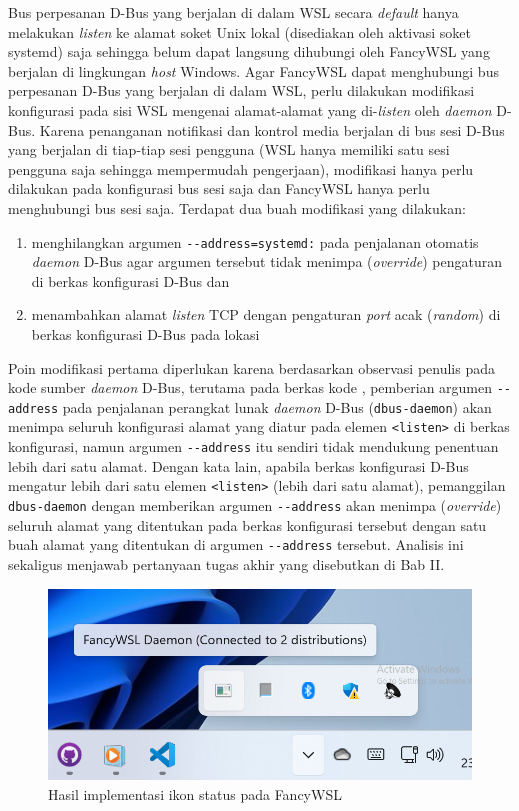 Bus perpesanan D-Bus yang berjalan di dalam WSL secara \textit{default} hanya melakukan \textit{listen} ke alamat soket Unix lokal (disediakan oleh aktivasi soket systemd) saja sehingga belum dapat langsung dihubungi oleh FancyWSL yang berjalan di lingkungan \textit{host} Windows. Agar FancyWSL dapat menghubungi bus perpesanan D-Bus yang berjalan di dalam WSL, perlu dilakukan modifikasi konfigurasi pada sisi WSL mengenai alamat-alamat yang di-\textit{listen} oleh \textit{daemon} D-Bus. Karena penanganan notifikasi dan kontrol media berjalan di bus sesi D-Bus yang berjalan di tiap-tiap sesi pengguna (WSL hanya memiliki satu sesi pengguna saja sehingga mempermudah pengerjaan), modifikasi hanya perlu dilakukan pada konfigurasi bus sesi saja dan FancyWSL hanya perlu menghubungi bus sesi saja. Terdapat dua buah modifikasi yang dilakukan:
\begin{enumerate}
    \item menghilangkan argumen \verb|--address=systemd:| pada penjalanan otomatis \textit{daemon} D-Bus agar argumen tersebut tidak menimpa (\textit{override}) pengaturan di berkas konfigurasi D-Bus dan
    \item menambahkan alamat \textit{listen} TCP dengan pengaturan \textit{port} acak (\textit{random}) di berkas konfigurasi D-Bus pada lokasi 
\end{enumerate}
Poin modifikasi pertama diperlukan karena berdasarkan observasi penulis pada kode sumber \textit{daemon} D-Bus, terutama pada berkas kode  \cite{dbus-source-code-address-argumen-and-listen-config}, pemberian argumen \verb|--address| pada penjalanan perangkat lunak \textit{daemon} D-Bus (\verb|dbus-daemon|) akan menimpa seluruh konfigurasi alamat yang diatur pada elemen \verb|<listen>| di berkas konfigurasi, namun argumen \verb|--address| itu sendiri tidak mendukung penentuan lebih dari satu alamat. Dengan kata lain, apabila berkas konfigurasi D-Bus mengatur lebih dari satu elemen \verb|<listen>| (lebih dari satu alamat), pemanggilan \verb|dbus-daemon| dengan memberikan argumen \verb|--address| akan menimpa (\textit{override}) seluruh alamat yang ditentukan pada berkas konfigurasi tersebut dengan satu buah alamat yang ditentukan di argumen \verb|--address| tersebut. Analisis ini sekaligus menjawab pertanyaan tugas akhir yang disebutkan di Bab II.

\begin{figure}
    \centering
    \includegraphics[width=0.5\linewidth]{assets/Screenshot 2024-01-23 015018.png}
    \caption{Hasil implementasi ikon status pada FancyWSL}
    \label{fancywsl-status-icon-in-taskbar}
\end{figure}


